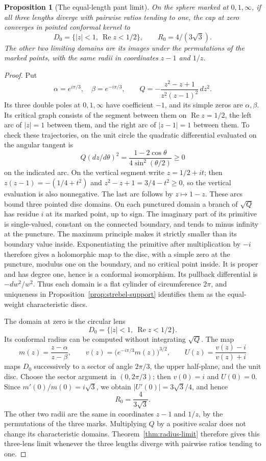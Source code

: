 \documentclass[11pt,a4paper]{article}
\newtheorem{proposition}[theorem]{Proposition}
\theoremstyle{definition}
\begin{document}
\begin{proposition}[The equal-length pant limit]\label{prop:orange-limit}
On the sphere marked at $0,1,\infty$, if all three lengths diverge with pairwise ratios tending to one, the cap at zero converges in pointed conformal kernel to
\[
 D_0=\{|z|<1,\ \operatorname{Re}z<1/2\},\qquad R_0=4/(3\sqrt3).
\]
The other two limiting domains are its images under the permutations of the marked points, with the same radii in coordinates $z-1$ and $1/z$.
\end{proposition}
\begin{proof}
Put
\[
 \alpha=e^{i\pi/3},\quad \beta=e^{-i\pi/3},\qquad
 Q=-\frac{z^2-z+1}{z^2(z-1)^2}\,dz^2.
\]
Its three double poles at $0,1,\infty$ have coefficient $-1$, and its simple zeros are $\alpha,\beta$. Its critical graph consists of the segment between them on $\operatorname{Re}z=1/2$, the left arc of $|z|=1$ between them, and the right arc of $|z-1|=1$ between them. To check these trajectories, on the unit circle the quadratic differential evaluated on the angular tangent is
\[
       Q(dz/d\theta)^2=\frac{1-2\cos\theta}{4\sin^2(\theta/2)}\ge0
\]
on the indicated arc. On the vertical segment write $z=1/2+it$; then $z(z-1)=-(1/4+t^2)$ and $z^2-z+1=3/4-t^2\ge0$, so the vertical evaluation is also nonnegative. The last arc follows by $z\mapsto1-z$. These arcs bound three pointed disc domains. On each punctured domain a branch of $\sqrt Q$ has residue $i$ at its marked point, up to sign. The imaginary part of its primitive is single-valued, constant on the connected boundary, and tends to minus infinity at the puncture. The maximum principle makes it strictly smaller than its boundary value inside. Exponentiating the primitive after multiplication by $-i$ therefore gives a holomorphic map to the disc, with a simple zero at the puncture, modulus one on the boundary, and no critical point inside. It is proper and has degree one, hence is a conformal isomorphism. Its pullback differential is $-dw^2/w^2$. Thus each domain is a flat cylinder of circumference $2\pi$, and uniqueness in Proposition~\ref{prop:strebel-support} identifies them as the equal-weight characteristic discs.

The domain at zero is the circular lens
\[
              D_0=\{|z|<1,\ \operatorname{Re}z<1/2\}.
\]
Its conformal radius can be computed without integrating $\sqrt Q$. The map
\[
 m(z)=\frac{z-\alpha}{z-\beta},\qquad
 v(z)=\bigl(e^{-i\pi/3}m(z)\bigr)^{3/2},\qquad
 U(z)=\frac{v(z)-i}{v(z)+i}
\]
maps $D_0$ successively to a sector of angle $2\pi/3$, the upper half-plane, and the unit disc. Choose the sector argument in $(0,2\pi/3)$; then $v(0)=i$ and $U(0)=0$. Since $m'(0)/m(0)=i\sqrt3$, we obtain $|U'(0)|=3\sqrt3/4$, and hence
\[
                         R_0=\frac4{3\sqrt3}.
\]
The other two radii are the same in coordinates $z-1$ and $1/z$, by the permutations of the three marks. Multiplying $Q$ by a positive scalar does not change its characteristic domains. Theorem~\ref{thm:radius-limit} therefore gives this three-lens limit whenever the three lengths diverge with pairwise ratios tending to one.
\end{proof}
\end{document}
